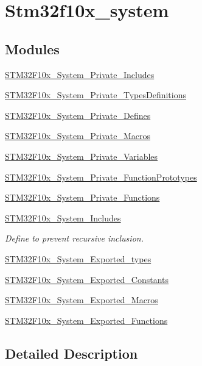 \hypertarget{group__stm32f10x__system}{}\section{Stm32f10x\+\_\+system}
\label{group__stm32f10x__system}
\subsection*{Modules}
\begin{DoxyCompactItemize}
\item 
\hyperlink{group___s_t_m32_f10x___system___private___includes}{S\+T\+M32\+F10x\+\_\+\+System\+\_\+\+Private\+\_\+\+Includes}
\item 
\hyperlink{group___s_t_m32_f10x___system___private___types_definitions}{S\+T\+M32\+F10x\+\_\+\+System\+\_\+\+Private\+\_\+\+Types\+Definitions}
\item 
\hyperlink{group___s_t_m32_f10x___system___private___defines}{S\+T\+M32\+F10x\+\_\+\+System\+\_\+\+Private\+\_\+\+Defines}
\item 
\hyperlink{group___s_t_m32_f10x___system___private___macros}{S\+T\+M32\+F10x\+\_\+\+System\+\_\+\+Private\+\_\+\+Macros}
\item 
\hyperlink{group___s_t_m32_f10x___system___private___variables}{S\+T\+M32\+F10x\+\_\+\+System\+\_\+\+Private\+\_\+\+Variables}
\item 
\hyperlink{group___s_t_m32_f10x___system___private___function_prototypes}{S\+T\+M32\+F10x\+\_\+\+System\+\_\+\+Private\+\_\+\+Function\+Prototypes}
\item 
\hyperlink{group___s_t_m32_f10x___system___private___functions}{S\+T\+M32\+F10x\+\_\+\+System\+\_\+\+Private\+\_\+\+Functions}
\item 
\hyperlink{group___s_t_m32_f10x___system___includes}{S\+T\+M32\+F10x\+\_\+\+System\+\_\+\+Includes}
\begin{DoxyCompactList}\small\item\em Define to prevent recursive inclusion. \end{DoxyCompactList}\item 
\hyperlink{group___s_t_m32_f10x___system___exported__types}{S\+T\+M32\+F10x\+\_\+\+System\+\_\+\+Exported\+\_\+types}
\item 
\hyperlink{group___s_t_m32_f10x___system___exported___constants}{S\+T\+M32\+F10x\+\_\+\+System\+\_\+\+Exported\+\_\+\+Constants}
\item 
\hyperlink{group___s_t_m32_f10x___system___exported___macros}{S\+T\+M32\+F10x\+\_\+\+System\+\_\+\+Exported\+\_\+\+Macros}
\item 
\hyperlink{group___s_t_m32_f10x___system___exported___functions}{S\+T\+M32\+F10x\+\_\+\+System\+\_\+\+Exported\+\_\+\+Functions}
\end{DoxyCompactItemize}


\subsection{Detailed Description}
